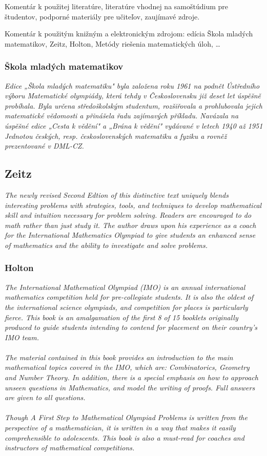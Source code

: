 \documentclass[11pt,a4paper,oneside,final]{book}
\begin{document}
Komentár k použitej literatúre, literatúre vhodnej na samoštúdium pre študentov, podporné materiály pre učiteľov, zaujímavé zdroje.

Komentár k použitým knižným a elektronickým zdrojom: edícia Škola mladých matematikov, Zeitz, Holton, Metódy riešenia matematických úloh, \dots

\subsubsection*{Škola mladých matematikov}
\textit{Edice „Škola mladých matematiku" byla založena roku 1961 na podnět Ústředního výboru Matematické olympiády, která tehdy v Československu již deset let úspěšně probíhala. Byla určena středoškolským studentum, rozšiřovala a prohlubovala jejich matematické vědomosti a přinášela řadu zajímavých příkladu. Navázala na úspěšné edice „Cesta k vědění" a „Brána k vědění" vydávané v letech 1940 až 1951 Jednotou českých, resp. československých matematiku a fyziku a rovněž prezentované v DML-CZ.}

\subsection*{Zeitz}
\textit{The newly revised Second Edtion of this distinctive text uniquely blends interesting problems with strategies, tools, and techniques to develop mathematical skill and intuition necessary for problem solving. Readers are encouraged to do math rather than just study it. The author draws upon his experience as a coach for the International Mathematics Olympiad to give students an enhanced sense of mathematics and the ability to investigate and solve problems.}

\subsubsection*{Holton}
\textit{The International Mathematical Olympiad (IMO) is an annual international mathematics competition held for pre-collegiate students. It is also the oldest of the international science olympiads, and competition for places is particularly fierce. This book is an amalgamation of the first 8 of 15 booklets originally produced to guide students intending to contend for placement on their country's IMO team.\\
\\The material contained in this book provides an introduction to the main mathematical topics covered in the IMO, which are: Combinatorics, Geometry and Number Theory. In addition, there is a special emphasis on how to approach unseen questions in Mathematics, and model the writing of proofs. Full answers are given to all questions.\\
\\Though A First Step to Mathematical Olympiad Problems is written from the perspective of a mathematician, it is written in a way that makes it easily comprehensible to adolescents. This book is also a must-read for coaches and instructors of mathematical competitions.}
\end{document}
